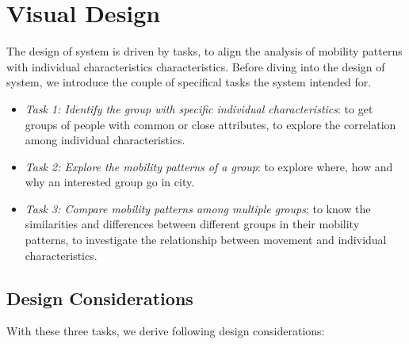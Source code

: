 \section{Visual Design}

The design of system is driven by tasks, to align the analysis of mobility patterns with individual characteristics characteristics. Before diving into the design of system, we introduce the couple of specifical tasks the system intended for. 

\begin{itemize}
\item \textit{Task 1: Identify the group with specific individual characteristics}: to get groups of people with common or close attributes, to explore the correlation among individual characteristics.
\item \textit{Task 2: Explore the mobility patterns of a group}: to explore where, how and why an interested group go in city. 
\item \textit{Task 3: Compare mobility patterns among multiple groups}: to know the similarities and differences between different groups in their mobility patterns, to investigate the relationship between movement and individual characteristics.
\end{itemize}

\subsection{Design Considerations}

With these three tasks, we derive following design considerations:

